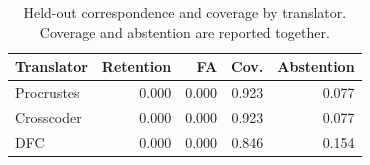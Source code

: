 \begin{table}[t]
\centering
\small
\begin{tabular}{lrrrr}
\toprule
Translator & Retention & FA & Cov. & Abstention \\
\midrule
Procrustes & 0.000 & 0.000 & 0.923 & 0.077 \\
Crosscoder & 0.000 & 0.000 & 0.923 & 0.077 \\
DFC & 0.000 & 0.000 & 0.846 & 0.154 \\
\bottomrule
\end{tabular}
\caption{Held-out correspondence and coverage by translator. Coverage and abstention are reported together.}
\label{tab:table_5_2_natural_tiny}
\end{table}